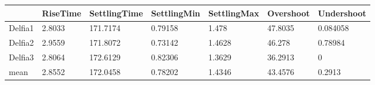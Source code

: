 \begin{tabular}{lllllll}
& RiseTime & SettlingTime & SettlingMin & SettlingMax & Overshoot & Undershoot \\ 
\hline 
Delfia1 & 2.8033 & 171.7174 & 0.79158 & 1.478 & 47.8035 & 0.084058 \\ 
Delfia2 & 2.9559 & 171.8072 & 0.73142 & 1.4628 & 46.278 & 0.78984 \\ 
Delfia3 & 2.8064 & 172.6129 & 0.82306 & 1.3629 & 36.2913 & 0 \\ 
mean & 2.8552 & 172.0458 & 0.78202 & 1.4346 & 43.4576 & 0.2913 \\ 
\hline 
\end{tabular}